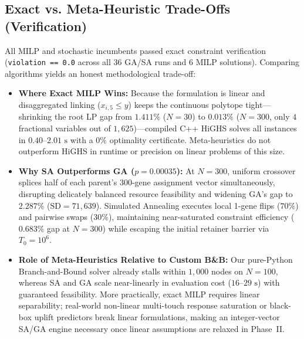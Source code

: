 \documentclass[10pt,a4paper]{article}
\begin{document}
\subsection{Exact vs. Meta-Heuristic Trade-Offs (Verification)}
All MILP and stochastic incumbents passed exact constraint verification (\texttt{violation == 0.0} across all 36 GA/SA runs and 6 MILP solutions). Comparing algorithms yields an honest methodological trade-off:
\begin{itemize}
    \item \textbf{Where Exact MILP Wins:} Because the formulation is linear and disaggregated linking ($x_{i,5} \le y$) keeps the continuous polytope tight---shrinking the root LP gap from $1.411\%$ ($N=30$) to $0.013\%$ ($N=300$, only $4$ fractional variables out of $1{,}625$)---compiled C++ HiGHS solves all instances in $0.40$--$2.01\text{ s}$ with a $0\%$ optimality certificate. Meta-heuristics do not outperform HiGHS in runtime or precision on linear problems of this size.
    \item \textbf{Why SA Outperforms GA ($p = 0.00035$):} At $N=300$, uniform crossover splices half of each parent's $300$-gene assignment vector simultaneously, disrupting delicately balanced resource feasibility and widening GA's gap to $2.287\%$ ($\text{SD} = 71{,}639$). Simulated Annealing executes local 1-gene flips ($70\%$) and pairwise swaps ($30\%$), maintaining near-saturated constraint efficiency ($0.683\%$ gap at $N=300$) while escaping the initial retainer barrier via $T_0 = 10^6$.
    \item \textbf{Role of Meta-Heuristics Relative to Custom B\&B:} Our pure-Python Branch-and-Bound solver already stalls within $1{,}000$ nodes on $N=100$, whereas SA and GA scale near-linearly in evaluation cost ($16$--$29\text{ s}$) with guaranteed feasibility. More practically, exact MILP requires linear separability; real-world non-linear multi-touch response saturation or black-box uplift predictors break linear formulations, making an integer-vector SA/GA engine necessary once linear assumptions are relaxed in Phase~II.
\end{itemize}
\end{document}
